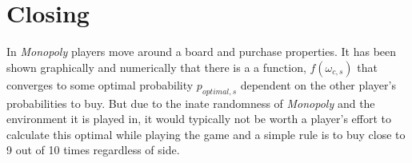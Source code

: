 \documentclass{article}
\begin{document}
\section{Closing}

In \textit{Monopoly} players move around a board and purchase properties.  It has been shown graphically and numerically that there is a a function, $f(\omega_{c,s})$ that converges to some optimal probability $p_{optimal,s}$ dependent on the other player's probabilities to buy.  But due to the inate randomness of \textit{Monopoly} and the environment it is played in, it would typically not be worth a player's effort to calculate this optimal while playing the game and a simple rule is to buy close to 9 out of 10 times regardless of side.  
\end{document}

